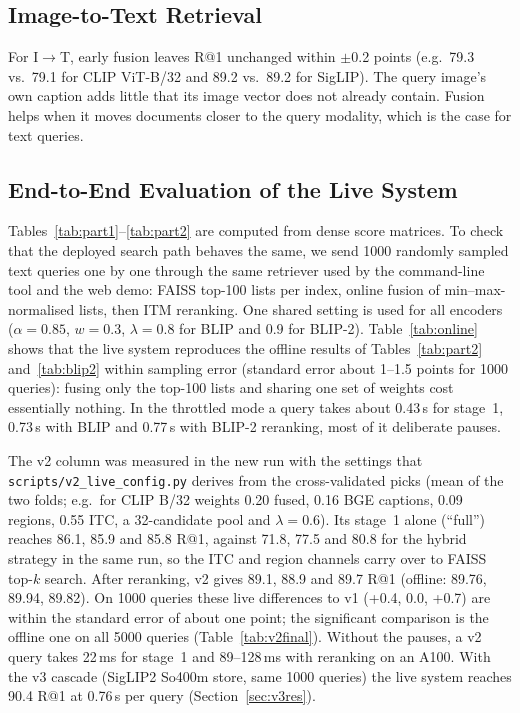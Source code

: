 \documentclass[conference]{IEEEtran}
\newcommand{\RA}{\ensuremath{\rightarrow}}
\begin{document}
\subsection{Image-to-Text Retrieval}
For I\RA T, early fusion leaves R@1 unchanged within $\pm$0.2 points (e.g.\ 79.3 vs.\ 79.1 for CLIP ViT-B/32 and
89.2 vs.\ 89.2 for SigLIP). The query image's own caption adds little that its image vector does not
already contain. Fusion helps when it moves documents closer to the query modality, which is the case
for text queries.

\subsection{End-to-End Evaluation of the Live System}
\label{sec:live}
Tables~\ref{tab:part1}--\ref{tab:part2} are computed from dense score matrices. To check that the deployed
search path behaves the same, we send 1000 randomly sampled text queries one by one through the same
retriever used by the command-line tool and the web demo: FAISS top-100 lists per index, online fusion of
min--max-normalised lists, then ITM reranking. One shared setting is used for all encoders ($\alpha=0.85$,
$w=0.3$, $\lambda=0.8$ for BLIP and $0.9$ for BLIP-2). Table~\ref{tab:online} shows that the live system
reproduces the offline results of Tables~\ref{tab:part2} and~\ref{tab:blip2} within sampling error (standard
error about 1--1.5 points for 1000 queries): fusing only the top-100 lists and sharing one set of weights cost
essentially nothing. In the throttled mode a query takes about 0.43\,s for stage~1, 0.73\,s with BLIP and
0.77\,s with BLIP-2 reranking, most of it deliberate pauses.

The v2 column was measured in the new run with the settings that \texttt{scripts/v2\_live\_config.py} derives from
the cross-validated picks (mean of the two folds; e.g.\ for CLIP B/32 weights 0.20 fused, 0.16 BGE captions, 0.09
regions, 0.55 ITC, a 32-candidate pool and $\lambda=0.6$). Its stage~1 alone (``full'') reaches 86.1, 85.9 and 85.8
R@1, against 71.8, 77.5 and 80.8 for the hybrid strategy in the same run, so the ITC and region channels carry over
to FAISS top-$k$ search. After reranking, v2 gives 89.1, 88.9 and 89.7 R@1 (offline: 89.76, 89.94, 89.82). On
1000 queries these live differences to v1 (+0.4, 0.0, +0.7) are within the standard error of about one point;
the significant comparison is the offline one on all 5000 queries (Table~\ref{tab:v2final}). Without the pauses,
a v2 query takes 22\,ms for stage~1 and 89--128\,ms with reranking on an A100. With the v3 cascade (SigLIP2 So400m
store, same 1000 queries) the live system reaches 90.4 R@1 at 0.76\,s per query (Section~\ref{sec:v3res}).
\end{document}
